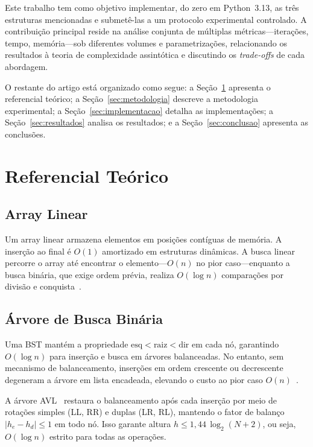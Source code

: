 \documentclass[conference,a4paper]{IEEEtran}
\begin{document}
Este trabalho tem como objetivo implementar, do zero em Python~3.13, as
três estruturas mencionadas e submetê-las a um protocolo experimental
controlado. A contribuição principal reside na análise conjunta de
múltiplas métricas—iterações, tempo, memória—sob diferentes volumes e
parametrizações, relacionando os resultados à teoria de complexidade
assintótica e discutindo os \textit{trade-offs} de cada abordagem.

O restante do artigo está organizado como segue: a Seção~\ref{sec:teoria}
apresenta o referencial teórico; a Seção~\ref{sec:metodologia} descreve
a metodologia experimental; a Seção~\ref{sec:implementacao} detalha as
implementações; a Seção~\ref{sec:resultados} analisa os resultados; e a
Seção~\ref{sec:conclusao} apresenta as conclusões.

\section{Referencial Teórico}
\label{sec:teoria}

\subsection{Array Linear}

Um array linear armazena elementos em posições contíguas de memória.
A inserção ao final é $O(1)$ amortizado em estruturas dinâmicas. A
busca linear percorre o array até encontrar o elemento—$O(n)$ no pior
caso—enquanto a busca binária, que exige ordem prévia, realiza $O(\log n)$
comparações por divisão e conquista~\cite{knuth1998}.

\subsection{Árvore de Busca Binária}

Uma BST mantém a propriedade $\text{esq} < \text{raiz} < \text{dir}$ em
cada nó, garantindo $O(\log n)$ para inserção e busca em árvores
balanceadas. No entanto, sem mecanismo de balanceamento, inserções em
ordem crescente ou decrescente degeneram a árvore em lista encadeada,
elevando o custo ao pior caso $O(n)$~\cite{cormen2022}.

A árvore AVL~\cite{adelson1962} restaura o balanceamento após cada
inserção por meio de rotações simples (LL, RR) e duplas (LR, RL),
mantendo o fator de balanço $|h_e - h_d| \leq 1$ em todo nó. Isso
garante altura $h \leq 1{,}44\,\log_2(N+2)$, ou seja, $O(\log n)$
estrito para todas as operações.
\end{document}
